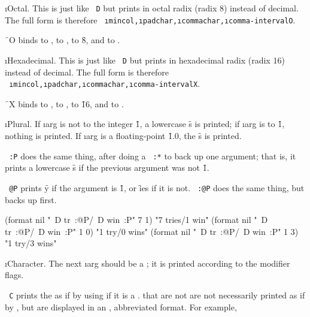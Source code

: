 
\i{Octal}.
This is just like {\tt ~D} but prints in octal radix (radix 8)
instead of decimal.  The full form is therefore
{\tt ~\i{mincol},\i{padchar},\i{commachar},\i{comma-interval}O}.

\f{~O} binds
      to ,
      to ,
      to \f{8},
 and  to .


\i{Hexadecimal}.
This is just like {\tt ~D} but prints in hexadecimal radix
(radix 16) instead of decimal.  The full form is therefore
{\tt ~\i{mincol},\i{padchar},\i{commachar},\i{comma-interval}X}.

\f{~X} binds
      to ,
      to ,
      to \f{16},
 and  to .


\i{Plural}.
If \i{arg} is not  
to the integer \f{1}, a lowercase \f{s} is
printed; if \i{arg} is  to \f{1}, nothing is printed.  
If \i{arg} is a floating-point \f{1.0}, the \f{s} is
printed.

{\tt ~:P} does the same thing, 
after doing a {\tt ~:*} to back up one argument;
that is, it prints a lowercase \f{s} if the previous argument was not
\f{1}.  

{\tt ~@P} 
prints \f{y} if the argument is \f{1}, or \f{ies} if it is
not.  {\tt ~:@P} does the same thing, but backs up first.

\code
 (format nil "~D tr~:@P/~D win~:P" 7 1) \EV "7 tries/1 win"
 (format nil "~D tr~:@P/~D win~:P" 1 0) \EV "1 try/0 wins"
 (format nil "~D tr~:@P/~D win~:P" 1 3) \EV "1 try/3 wins"
\endcode
               
\i{Character}.  The next \i{arg} should be a ; 
it is printed
according to the modifier flags.


{\tt ~C} prints the  
as if by using  if it is a .
 that are not 
are not necessarily printed as if by ,
but are displayed in an , abbreviated format.
For example,

